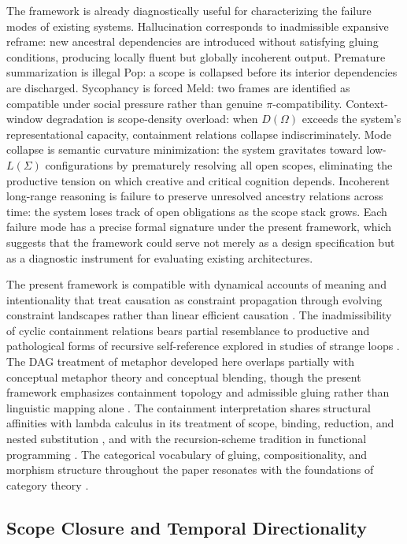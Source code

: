 \documentclass[12pt, a4paper]{article}
\theoremstyle{plain}
\theoremstyle{definition}
\theoremstyle{remark}
\begin{document}
The framework is already diagnostically useful for characterizing the failure
modes of existing systems. Hallucination corresponds to inadmissible expansive
reframe: new ancestral dependencies are introduced without satisfying gluing
conditions, producing locally fluent but globally incoherent output. Premature
summarization is illegal Pop: a scope is collapsed before its interior
dependencies are discharged. Sycophancy is forced Meld: two frames are
identified as compatible under social pressure rather than genuine
$\pi$-compatibility. Context-window degradation is scope-density overload:
when $D(\Omega)$ exceeds the system's representational capacity, containment
relations collapse indiscriminately. Mode collapse is semantic curvature
minimization: the system gravitates toward low-$L(\Sigma)$ configurations by
prematurely resolving all open scopes, eliminating the productive tension on
which creative and critical cognition depends. Incoherent long-range reasoning
is failure to preserve unresolved ancestry relations across time: the system
loses track of open obligations as the scope stack grows. Each failure mode
has a precise formal signature under the present framework, which suggests
that the framework could serve not merely as a design specification but as a
diagnostic instrument for evaluating existing architectures.

The present framework is compatible with dynamical accounts of meaning and
intentionality that treat causation as constraint propagation through evolving
constraint landscapes rather than linear efficient causation \cite{Juarrero1999}.
The inadmissibility of cyclic containment relations bears partial resemblance to
productive and pathological forms of recursive self-reference explored in
studies of strange loops \cite{Hofstadter1979}. The DAG treatment of metaphor
developed here overlaps partially with conceptual metaphor theory and
conceptual blending, though the present framework emphasizes containment
topology and admissible gluing rather than linguistic mapping alone
\cite{Lakoff1980,Fauconnier2002}. The containment interpretation shares
structural affinities with lambda calculus in its treatment of scope, binding,
reduction, and nested substitution \cite{Barendregt1984}, and with the
recursion-scheme tradition in functional programming \cite{Meijer1991}.
The categorical vocabulary of gluing, compositionality, and morphism structure
throughout the paper resonates with the foundations of category theory
\cite{MacLane1998}.


\subsection{Scope Closure and Temporal Directionality}
\end{document}

